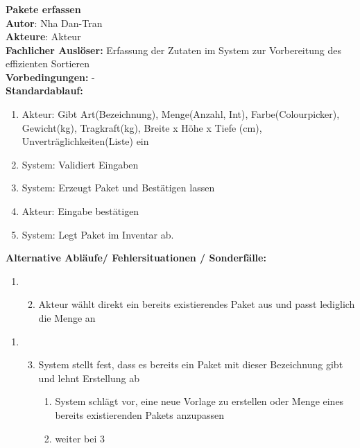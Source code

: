 \subsubsection*{}
\textbf{Pakete erfassen}\bigskip\\
\textbf{Autor}: Nha Dan-Tran\\
\textbf{Akteure}: Akteur\\
\textbf{Fachlicher Auslöser:} Erfassung der Zutaten im System zur Vorbereitung des effizienten Sortieren\\
\textbf{Vorbedingungen: }-\\
\textbf{Standardablauf:} 

\begin{enumerate}
    \item Akteur: Gibt Art(Bezeichnung), Menge(Anzahl, Int), Farbe(Colourpicker), Gewicht(kg), Tragkraft(kg), Breite x Höhe x Tiefe (cm), Unverträglichkeiten(Liste) ein \label{enum:first}
    \item System: Validiert Eingaben \label{enum:second}
    \item System: Erzeugt Paket und Bestätigen lassen
    \item Akteur: Eingabe bestätigen
    \item System: Legt Paket im Inventar ab.
\end{enumerate}

\textbf{Alternative Abläufe/ Fehlersituationen / Sonderfälle:}
\begin{enumerate}
    \item[] \begin{enumerate}\setcounter{enumi}{1}
        \item Akteur wählt direkt ein bereits existierendes Paket aus und passt lediglich die Menge an
    \end{enumerate}
\end{enumerate}

\begin{enumerate}
    \item[] \begin{enumerate}\setcounter{enumi}{2}
\item System stellt fest, dass es bereits ein Paket mit dieser Bezeichnung gibt und lehnt Erstellung ab
    \begin{enumerate}
    \item System schlägt vor, eine neue Vorlage zu erstellen oder Menge eines bereits existierenden Pakets anzupassen
    \item weiter bei 3
\end{enumerate}
\end{enumerate}
\end{enumerate}

